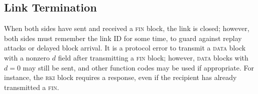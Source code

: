 \subsection{Link Termination}

When both sides have sent and received a \textsc{fin} block, the link
is closed; however, both sides must remember the link ID for some
time, to guard against replay attacks or delayed block arrival.  It is
a protocol error to transmit a \textsc{data} block with a nonzero $d$
field after transmitting a \textsc{fin} block; however, \textsc{data}
blocks with $d=0$ may still be sent, and other function codes may be
used if appropriate.  For instance, the \textsc{rki} block requires a
response, even if the recipient has already transmitted a
\textsc{fin}.
